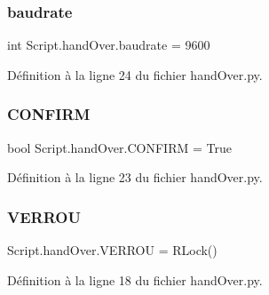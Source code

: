 \subsubsection{\texorpdfstring{baudrate}{baudrate}}
{\footnotesize\ttfamily int Script.\+hand\+Over.\+baudrate = 9600}



Définition à la ligne 24 du fichier hand\+Over.\+py.

\mbox{\label{namespaceScript_1_1handOver_a1f8a11e1df500a2ab144549e8f3e4703}} 
\subsubsection{\texorpdfstring{C\+O\+N\+F\+I\+RM}{CONFIRM}}
{\footnotesize\ttfamily bool Script.\+hand\+Over.\+C\+O\+N\+F\+I\+RM = True}



Définition à la ligne 23 du fichier hand\+Over.\+py.

\mbox{\label{namespaceScript_1_1handOver_a94f94a457b98f7aa4528c5118490f262}} 
\subsubsection{\texorpdfstring{V\+E\+R\+R\+OU}{VERROU}}
{\footnotesize\ttfamily Script.\+hand\+Over.\+V\+E\+R\+R\+OU = R\+Lock()}



Définition à la ligne 18 du fichier hand\+Over.\+py.

